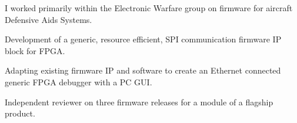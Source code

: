 I worked primarily within the Electronic Warfare group on firmware for aircraft Defensive Aids Systems.
\vspace{0.25em}
\begin{tightemize}
  \item Development of a generic, resource efficient, SPI communication firmware IP block for FPGA.
  \item Adapting existing firmware IP and software to create an Ethernet connected generic FPGA debugger with a PC GUI.
  \item Independent reviewer on three firmware releases for a module of a flagship product.
\end{tightemize}
\sectionsep{}
\vfill{}
